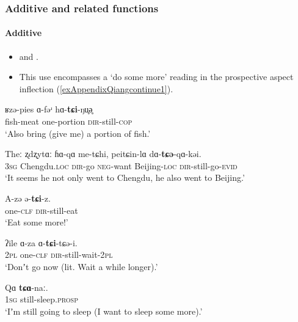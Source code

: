 \subsubsection{Additive and related functions}
\paragraph{Additive}\label{appendixQiangAdditive}
\begin{itemize}
	\item  \textcite{Huang2005} and \textcite[169–170]{LaPollaHuang2003}.
	\item This use encompasses a \lq do some more\rq{ }reading in the prospective aspect inflection (\ref{exAppendixQiangcontinue1}).
\end{itemize}

\begin{exe}
	\ex 
	\gll ʁzə-pies ɑ-fəʴ hɑ-\textbf{tɕi}-ŋu̥ə̥\\
	fish-meat one-portion \textsc{dir}-still-\textsc{cop}\\
	\glt \lq Also bring (give me) a portion of fish.' \parencite[170]{LaPollaHuang2003}
	
	\ex
	\gll Theː ʐdʐytɑː ɦɑ-qɑ me-tɕhi, peitɕin-lɑ dɑ-\textbf{tɕə}-qɑ-kəi.\\
	3\textsc{sg} Chengdu.\textsc{loc} \textsc{dir}-go \textsc{neg}-want Beijing-\textsc{loc} \textsc{dir}-still-go-\textsc{evid}\\
	\glt \lq It seems he not only went to Chengdu, he also went to Beijing.\rq{ }\parencite[209]{LaPollaHuang2003}

	\ex\label{exAppendixNorthernQiangIncrement1}
	\gll A-zə ə-\textbf{tɕi}-z.\\
	one-\textsc{clf} \textsc{dir}-still-eat\\
	\glt \lq Eat some more!\rq{ }\parencite{Huang2005}

	\ex\label{exAppendixNorthernQiangIncrement2}
	\gll ʔile ɑ-za ɑ-\textbf{tɕi}-tɕə-i.\\
	2\textsc{pl} one-\textsc{clf} \textsc{dir}-still-wait-2\textsc{pl}\\
	\glt \lq Donʼt go now (lit. Wait a while longer).' \parencite[170]{LaPollaHuang2003}
	
	\ex\label{exAppendixQiangcontinue1}
	\gll Qɑ \textbf{tɕɑ}-naː.\\
	1\textsc{sg} still-sleep.\textsc{prosp}\\
	\glt \lq Iʼm still going to sleep (I want to sleep some more).\rq{ }\parencite[169]{LaPollaHuang2003}
\end{exe}


